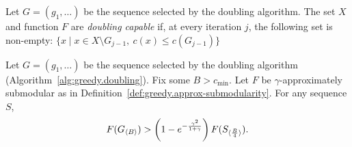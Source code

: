  
\begin{definition} 
\label{def:greedy.doubling-capable}
Let $G = (g_1, \ldots)$ be the sequence selected by the doubling
algorithm.  The set $X$ and function $F$ are \textit{doubling capable}
if, at every iteration $j$, the following set is non-empty:
$
\{x \mid x \in X \setminus G_{j-1},\ c(x) \le c(G_{j-1})\}
$
\end{definition}

\begin{theorem}
\label{thm:greedy.doubling-greedy-bound-approx}
Let $G = (g_1, \ldots)$ be the sequence selected by the doubling
algorithm (Algorithm~\ref{alg:greedy.doubling}).  Fix some $B >
c_{\textrm{min}}$.  Let $F$ be $\gamma$-approximately
submodular as in Definition~\ref{def:greedy.approx-submodularity}.
For any sequence $S$,
\[
F(G_{\langle B \rangle}) > \left(1 - e^{-\frac{\gamma^2}{1+\gamma}} \right) F(S_{\langle \frac{B}{4} \rangle}).
\]
\end{theorem}
